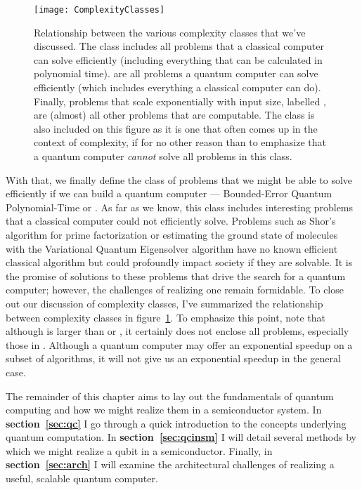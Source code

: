 \begin{figure}
  \texttt{[image: ComplexityClasses]}
  \caption[Relationship between various complexity classes]
  {Relationship between the various complexity classes that we've discussed. The class
   includes all problems that a classical computer can solve efficiently (including
  everything that can be calculated in polynomial time).  are all problems a quantum computer can 
  solve efficiently (which includes everything a classical computer can do). Finally, problems that scale exponentially
  with input size, labelled , are (almost) all other problems that are computable. The class
   is also included on this figure as it is one that often comes up in the context of complexity,
  if for no other reason than to emphasize that a quantum computer \emph{cannot} solve all problems in
  this class.}
  \label{fig:complexity}
\end{figure}

With that, we finally define the class of problems that we might be able to solve efficiently if we 
can build a quantum computer --- Bounded-Error Quantum Polynomial-Time or . As far as we know,
this class includes interesting problems that a classical computer could not efficiently solve. Problems
such as Shor's algorithm for prime factorization\cite{Shor} or estimating the ground state of molecules with
the Variational Quantum Eigensolver algorithm\cite{ncomms5213} have no known efficient classical algorithm
but could profoundly impact society if they are solvable. It is the promise of solutions to these problems
that drive the search for a quantum computer; however, the challenges of realizing one remain formidable. To close
out our discussion of complexity classes, I've summarized the relationship between complexity classes in 
figure~\ref{fig:complexity}. To emphasize this point, note that although  is larger than 
or , it certainly does not enclose all problems, especially those in . Although a
quantum computer may offer an exponential speedup on a subset of algorithms, it will not give us an exponential
speedup in the general case.

The remainder of this chapter aims to lay out the fundamentals of quantum computing and how we might realize
them in a semiconductor system. In \textbf{section~\ref{sec:qc}} I go through a quick introduction to the concepts
underlying quantum computation. In \textbf{section~\ref{sec:qcinsm}} I will detail several methods by which we might
realize a qubit in a semiconductor. Finally, in \textbf{section~\ref{sec:arch}} I will examine the architectural
challenges of realizing a useful, scalable quantum computer.

